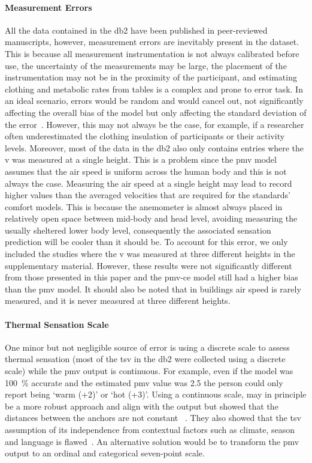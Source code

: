\paragraph{Measurement Errors}
All the data contained in the \ac{db2} have been published in peer-reviewed manuscripts, however, measurement errors are inevitably present in the dataset.
This is because all measurement instrumentation is not always calibrated before use, the uncertainty of the measurements may be large, the placement of the instrumentation may not be in the proximity of the participant, and estimating clothing and metabolic rates from tables is a complex and prone to error task.
In an ideal scenario, errors would be random and would cancel out, not significantly affecting the overall bias of the model but only affecting the standard deviation of the error~\cite{Humphreys2002}.
However, this may not always be the case, for example, if a researcher often underestimated the clothing insulation of participants or their activity levels.
Moreover, most of the data in the \ac{db2} also only contains entries where the \ac{v} was measured at a single height.
This is a problem since the \ac{pmv} model assumes that the air speed is uniform across the human body and this is not always the case.
Measuring the air speed at a single height may lead to record higher values than the averaged velocities that are required for the standards’ comfort models.
This is because the anemometer is almost always placed in relatively open space between mid-body and head level, avoiding measuring the usually sheltered lower body level, consequently the associated sensation prediction will be cooler than it should be.
To account for this error, we only included the studies where the \ac{v} was measured at three different heights in the supplementary material.
However, these results were not significantly different from those presented in this paper and the \ac{pmv-ce} model still had a higher bias than the \ac{pmv} model.
It should also be noted that in buildings air speed is rarely measured, and it is never measured at three different heights.

\paragraph{Thermal Sensation Scale}
One minor but not negligible source of error is using a discrete scale to assess thermal sensation (most of the \ac{tsv} in the \ac{db2} were collected using a discrete scale) while the \ac{pmv} output is continuous.
For example, even if the model was 100~\% accurate and the estimated \ac{pmv} value was \num{2.5} the person could only report being `warm (+2)' or `hot (+3)'.
Using a continuous scale, may in principle be a more robust approach and align with the output but  showed that the distances between the anchors are not constant ~\cite{schweiker2019scales, schweiker2020evaluating}.
They also showed that the \ac{tsv} assumption of its independence from contextual factors such as climate, season and language is flawed~\cite{schweiker2019scales, schweiker2020evaluating}.
An alternative solution would be to transform the \ac{pmv} output to an ordinal and categorical seven-point scale.